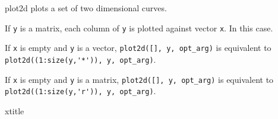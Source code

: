 \begin{mandescription}
  plot2d plots a set of two dimensional curves.

  If \verb+y+ is a matrix, each column of \verb+y+ is plotted against vector
  \verb+x+. In this case.

  If \verb+x+ is empty and \verb+y+ is a vector, \verb+plot2d([], y, opt_arg)+ is
  equivalent to \verb|plot2d((1:size(y,'*')), y, opt_arg)|.

  If \verb+x+ is empty and \verb+y+ is a matrix, \verb+plot2d([], y, opt_arg)+ is
  equivalent to \verb|plot2d((1:size(y,'r')), y, opt_arg)|.  
\end{mandescription}

\begin{examples}
  \begin{program}
  \end{program}
\end{examples}

\begin{manseealso}
  xtitle
\end{manseealso}

